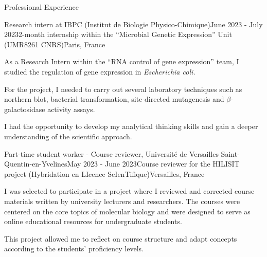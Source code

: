 \documentclass[
	10pt,
]{style} %
\begin{document}

\begin{rSection}{Professional Experience}

	\begin{rSubsection}{Research intern at IBPC (Institut de Biologie Physico-Chimique)}{June 2023 - July 2023}{2-month internship within the ``Microbial Genetic Expression'' Unit (UMR8261 CNRS)}{Paris, France}
		\item As a Research Intern within the ``RNA control of gene expression'' team, I studied the regulation of gene expression in \textit{Escherichia coli.}
		\item For the project, I needed to carry out several laboratory techniques such as northern blot, bacterial transformation, site-directed mutagenesis and $\beta$-galactosidase activity assays.
		\item I had the opportunity to develop my analytical thinking skills and gain a deeper understanding of the scientific approach.
	\end{rSubsection}


	\begin{rSubsection}{Part-time student worker - Course reviewer, Université de Versailles Saint-Quentin-en-Yvelines}{May 2023 - June 2023}{Course reviewer for the HILISIT project (Hybridation en LIcence ScIenTifique)}{Versailles, France}
		\item I was selected to participate in a project where I reviewed and corrected course materials written by university lecturers and researchers. The courses were centered on the core topics of molecular biology and were designed to serve as online educational resources for undergraduate students.
		\item This project allowed me to reflect on course structure and adapt concepts according to the students' proficiency levels.
	\end{rSubsection}

\end{rSection}

\end{document}
